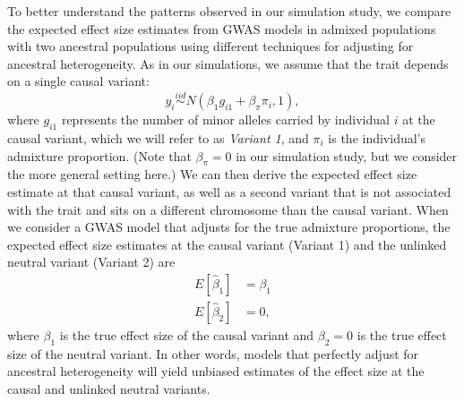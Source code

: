 \documentclass[12pt]{article}
\begin{document}
To better understand the patterns observed in our simulation study, we compare the expected effect size estimates from GWAS models in admixed populations with two ancestral populations using different techniques for adjusting for ancestral heterogeneity.
As in our simulations, we assume that the trait depends on a single causal variant: $$y_i \stackrel{iid}{\sim} N(\beta_1 g_{i1} + \beta_\pi \pi_i, 1),$$ where $g_{i1}$ represents the number of minor alleles carried by individual $i$ at the causal variant, which we will refer to as \textit{Variant 1}, and $\pi_i$ is the individual's admixture proportion.
(Note that $\beta_\pi = 0$ in our simulation study, but we consider the more general setting here.)
We can then derive the expected effect size estimate at that causal variant, as well as a second variant that is not associated with the trait and sits on a different chromosome than the causal variant.
When we consider a GWAS model that adjusts for the true admixture proportions,
the expected effect size estimates at the causal variant (Variant 1) and the unlinked neutral variant (Variant 2) are
\begin{equation}
\begin{aligned}
E[\hat\beta_1] &= \beta_1 \\
E[\hat\beta_2] &= 0,
\end{aligned}
\label{eqn:pi}
\end{equation}
where $\beta_1$ is the true effect size of the causal variant and $\beta_2 = 0$ is the true effect size of the neutral variant.
In other words, models that perfectly adjust for ancestral heterogeneity will yield unbiased estimates of the effect size at the causal and unlinked neutral variants.
\end{document}
